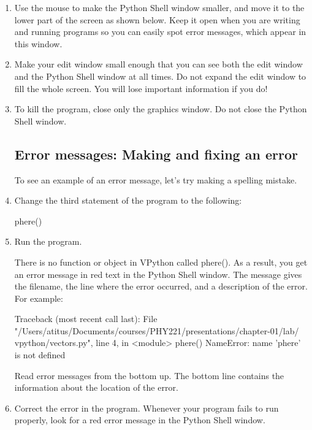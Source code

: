 \begin{enumerate}

	\item Use the mouse to make the Python Shell window smaller, and move it to the lower part of the screen as shown below. Keep it open when you are writing and running programs so you can easily spot error messages, which appear in this window. 
	\item Make your edit window small enough that you can see both the edit window and the Python Shell window at all times. Do not expand the edit window to fill the whole screen. You will lose important information if you do!
	\item To kill the program, close only the graphics window. Do not close the Python Shell window.
		
	\subsection*{Error messages: Making and fixing an error}
	
	To see an example of an error message, let's try making a spelling mistake.
	
	\item Change the third statement of the program to the following:
	
\begin{myvpython}
phere()
\end{myvpython}

	\item Run the program.

There is no function or object in VPython called phere(). As a result, you get an error message in red text in the Python Shell window. The message gives the filename, the line where the error occurred, and a description of the error. For example:

\begin{verbatimtab}
Traceback (most recent call last):
  File "/Users/atitus/Documents/courses/PHY221/presentations/chapter-01/lab/
vpython/vectors.py", line 4, in <module>
    phere()
NameError: name 'phere' is not defined
\end{verbatimtab}

Read error messages from the bottom up. The bottom line contains the information about the location of the error.

	\item Correct the error in the program. Whenever your program fails to run properly, look for a red error message in the Python Shell window.


\end{enumerate}
